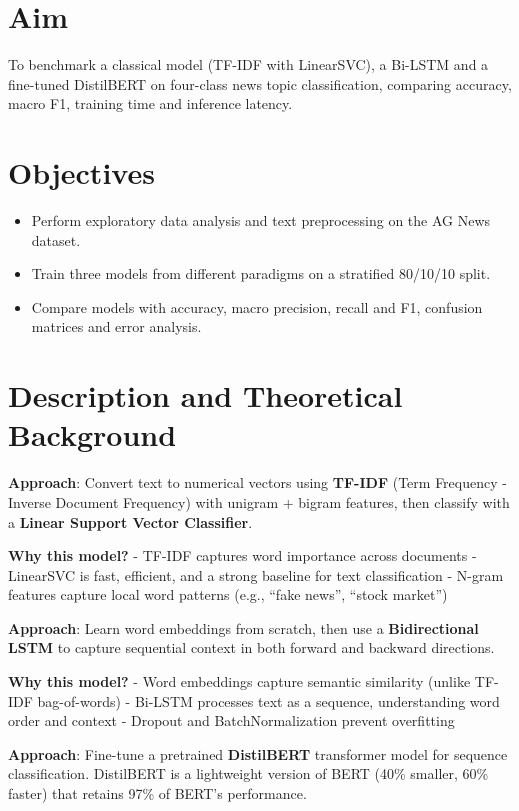 \documentclass[12pt,a4paper,oneside]{report}
\begin{document}
\section{Aim}
To benchmark a classical model (TF-IDF with LinearSVC), a Bi-LSTM and a fine-tuned DistilBERT on four-class news topic classification, comparing accuracy, macro F1, training time and inference latency.


\section{Objectives}
\begin{itemize}
\item Perform exploratory data analysis and text preprocessing on the AG News dataset.
\item Train three models from different paradigms on a stratified 80/10/10 split.
\item Compare models with accuracy, macro precision, recall and F1, confusion matrices and error analysis.
\end{itemize}

\section{Description and Theoretical Background}
\textbf{Approach}: Convert text to numerical vectors using \textbf{TF-IDF} (Term Frequency - Inverse Document Frequency) with unigram + bigram features, then classify with a \textbf{Linear Support Vector Classifier}.

\textbf{Why this model?}
- TF-IDF captures word importance across documents
- LinearSVC is fast, efficient, and a strong baseline for text classification
- N-gram features capture local word patterns (e.g., ``fake news'', ``stock market'')

\textbf{Approach}: Learn word embeddings from scratch, then use a \textbf{Bidirectional LSTM} to capture sequential context in both forward and backward directions.

\textbf{Why this model?}
- Word embeddings capture semantic similarity (unlike TF-IDF bag-of-words)
- Bi-LSTM processes text as a sequence, understanding word order and context
- Dropout and BatchNormalization prevent overfitting

\textbf{Approach}: Fine-tune a pretrained \textbf{DistilBERT} transformer model for sequence classification. DistilBERT is a lightweight version of BERT (40\% smaller, 60\% faster) that retains 97\% of BERT's performance.
\end{document}
